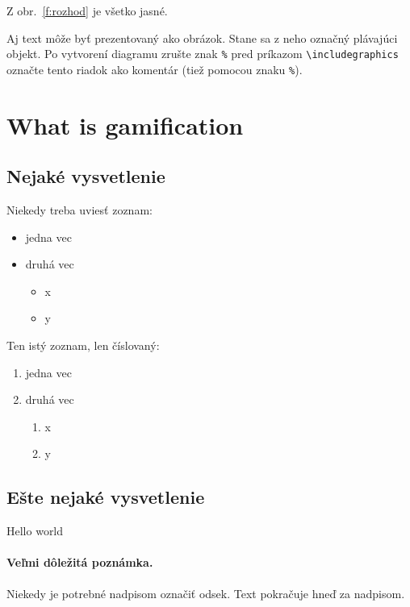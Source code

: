 \documentclass[10pt,twoside,english,a4paper]{article}
\begin{document}
Z obr.~\ref{f:rozhod} je všetko jasné. 

\begin{figure*}[tbh]
\centering
Aj text môže byť prezentovaný ako obrázok. Stane sa z neho označný plávajúci objekt. Po vytvorení diagramu zrušte znak \texttt{\%} pred príkazom \verb|\includegraphics| označte tento riadok ako komentár (tiež pomocou znaku \texttt{\%}).
\caption{Rozhodujúci argument.}
\label{f:rozhod}
\end{figure*}



\section{What is gamification} \label{section3}

\subsection{Nejaké vysvetlenie} \label{section3:1}

Niekedy treba uviesť zoznam:

\begin{itemize}
\item jedna vec
\item druhá vec
	\begin{itemize}
	\item x
	\item y
	\end{itemize}
\end{itemize}

Ten istý zoznam, len číslovaný:

\begin{enumerate}
\item jedna vec
\item druhá vec
	\begin{enumerate}
	\item x
	\item y
	\end{enumerate}
\end{enumerate}


\subsection{Ešte nejaké vysvetlenie} \label{section3:2}
Hello world

\paragraph{Veľmi dôležitá poznámka.}
Niekedy je potrebné nadpisom označiť odsek. Text pokračuje hneď za nadpisom.
\end{document}
